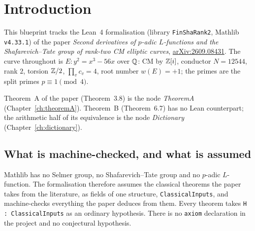 %
%

\chapter{Introduction}

This blueprint tracks the Lean~4 formalisation (library
\texttt{FinShaRank2}, Mathlib \texttt{v4.33.1}) of the paper
\emph{Second derivatives of $p$-adic $L$-functions and the
Shafarevich--Tate group of rank-two CM elliptic curves},
\href{https://arxiv.org/abs/2609.08431}{arXiv:2609.08431}. The curve
throughout is $E : y^2 = x^3 - 56x$ over $\mathbb{Q}$: CM by $\mathbb{Z}[i]$, conductor
$N = 12544$, rank $2$, torsion $\mathbb{Z}/2$, $\prod_v c_v = 4$, root number
$w(E) = +1$; the primes are the split primes $p \equiv 1 \pmod 4$.

Theorem~A of the paper (Theorem~3.8) is the node \emph{TheoremA}
(Chapter~\ref{ch:theoremA}). Theorem~B (Theorem~6.7) has no Lean
counterpart; the arithmetic half of its equivalence is the node
\emph{Dictionary} (Chapter~\ref{ch:dictionary}).

\section{What is machine-checked, and what is assumed}

Mathlib has no Selmer group, no Shafarevich--Tate group and no $p$-adic
$L$-function. The formalisation therefore assumes the classical theorems the
paper takes from the literature, as fields of one structure,
\texttt{ClassicalInputs}, and machine-checks everything the paper deduces
from them. Every theorem takes \texttt{H : ClassicalInputs} as an ordinary
hypothesis. There is no \texttt{axiom} declaration in the project and no
conjectural hypothesis.

